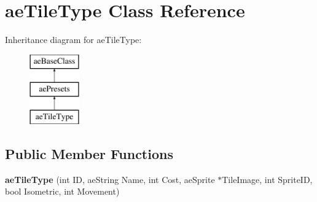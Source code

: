 \hypertarget{classae_tile_type}{}\section{ae\+Tile\+Type Class Reference}
\label{classae_tile_type}
Inheritance diagram for ae\+Tile\+Type\+:\begin{figure}[H]
\begin{center}
\leavevmode
\includegraphics[height=3.000000cm]{classae_tile_type}
\end{center}
\end{figure}
\subsection*{Public Member Functions}
\begin{DoxyCompactItemize}
\item 
{\bfseries ae\+Tile\+Type} (int ID, ae\+String Name, int Cost, ae\+Sprite $\ast$Tile\+Image, int Sprite\+ID, bool Isometric, int Movement)\hypertarget{classae_tile_type_ad606d9235b08645c3f196edb23c6125c}{}\label{classae_tile_type_ad606d9235b08645c3f196edb23c6125c}

\end{DoxyCompactItemize}
